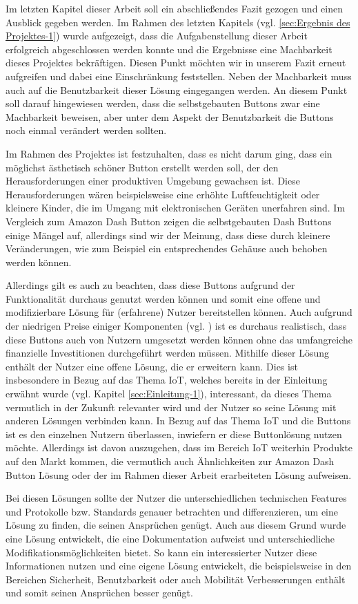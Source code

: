 Im letzten Kapitel dieser Arbeit soll ein abschließendes Fazit gezogen und einen Ausblick gegeben werden. Im Rahmen des letzten Kapitels (vgl. \ref{sec:Ergebnis des Projektes-1}) wurde aufgezeigt, dass die Aufgabenstellung dieser Arbeit erfolgreich abgeschlossen werden konnte und die Ergebnisse eine Machbarkeit dieses Projektes bekräftigen. Diesen Punkt möchten wir in unserem Fazit erneut aufgreifen und dabei eine Einschränkung feststellen. Neben der Machbarkeit muss auch auf die Benutzbarkeit dieser Lösung eingegangen werden. An diesem Punkt soll  darauf hingewiesen werden, dass die selbstgebauten Buttons zwar eine Machbarkeit beweisen, aber unter dem Aspekt der Benutzbarkeit die Buttons noch einmal verändert werden sollten. 

Im Rahmen des Projektes ist festzuhalten, dass es nicht darum ging, dass ein möglichst ästhetisch schöner Button erstellt werden soll, der den Herausforderungen einer produktiven Umgebung gewachsen ist. Diese Herausforderungen wären beispielsweise eine erhöhte Luftfeuchtigkeit oder kleinere Kinder, die im Umgang mit elektronischen Geräten unerfahren sind. Im Vergleich zum Amazon Dash Button zeigen die selbstgebauten Dash Buttons einige Mängel auf, allerdings sind wir der Meinung, dass diese durch kleinere Veränderungen, wie zum Beispiel ein entsprechendes Gehäuse auch behoben werden können. 

Allerdings gilt es auch zu beachten, dass diese Buttons aufgrund der Funktionalität durchaus genutzt werden können und somit eine offene und modifizierbare Lösung für (erfahrene) Nutzer bereitstellen können. Auch aufgrund der niedrigen Preise einiger Komponenten (vgl. \cite{.t}) ist es durchaus realistisch, dass diese Buttons auch von Nutzern umgesetzt werden können ohne das umfangreiche finanzielle Investitionen durchgeführt werden müssen. 
Mithilfe dieser Lösung enthält der Nutzer eine offene Lösung, die er erweitern kann. Dies ist insbesondere in Bezug auf das Thema \ac{IoT}, welches bereits in der Einleitung erwähnt wurde (vgl. Kapitel \ref{sec:Einleitung-1}), interessant, da dieses Thema vermutlich in der Zukunft relevanter wird und der Nutzer so seine Lösung mit anderen Lösungen verbinden kann. In Bezug auf das Thema \ac{IoT} und die Buttons ist es den einzelnen Nutzern überlassen, inwiefern er diese Buttonlösung nutzen möchte. Allerdings ist davon auszugehen, dass im Bereich \ac{IoT} weiterhin Produkte auf den Markt kommen, die vermutlich auch Ähnlichkeiten zur Amazon Dash Button Lösung oder der im Rahmen dieser Arbeit erarbeiteten Lösung aufweisen. 

Bei diesen Lösungen sollte der Nutzer die unterschiedlichen technischen Features und Protokolle bzw. Standards genauer betrachten und differenzieren, um eine Lösung zu finden, die seinen Ansprüchen genügt. 
Auch aus diesem Grund wurde eine Lösung entwickelt, die eine Dokumentation aufweist und unterschiedliche Modifikationsmöglichkeiten bietet. So kann ein interessierter Nutzer diese Informationen nutzen und eine eigene Lösung entwickelt, die beispielsweise in den Bereichen Sicherheit, Benutzbarkeit oder auch Mobilität Verbesserungen enthält und somit seinen Ansprüchen besser genügt. 